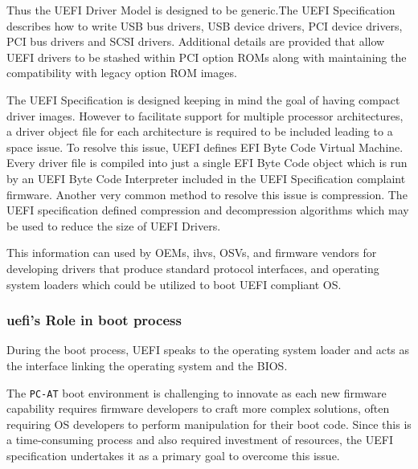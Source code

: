 Thus the UEFI Driver Model is designed to be generic.The UEFI Specification describes how to write USB bus drivers, USB device drivers, PCI device drivers, PCI bus drivers and SCSI drivers.
Additional details are provided that allow UEFI drivers to be stashed within PCI option ROMs along with maintaining the compatibility with legacy option ROM images.

The UEFI Specification is designed keeping in mind the goal of having compact driver images. However to facilitate support for multiple processor architectures, a driver object file for each architecture is required to be included leading to a space issue. To resolve this issue, UEFI defines EFI Byte Code Virtual Machine. Every driver file is compiled into just a single EFI Byte Code object which is run by an UEFI Byte Code Interpreter included in the UEFI Specification complaint firmware. Another very common method to resolve this issue is compression. The UEFI specification defined compression and decompression algorithms which may be used to reduce the size of UEFI Drivers.

This information can used by OEMs, \gls{ihv}s, OSVs, and firmware vendors for developing drivers that produce standard protocol interfaces, and operating system loaders which could be utilized to boot UEFI compliant OS.

\subsubsection{\gls{uefi}'s Role in boot process}

During the boot process, UEFI speaks to the operating system loader and acts as the interface linking the operating system and the BIOS.

The \verb|PC-AT| boot environment is challenging to innovate as each new firmware capability requires firmware developers to craft more complex solutions, often requiring OS developers to perform manipulation for their boot code. Since this is a time-consuming process and also required investment of resources, the UEFI specification undertakes it as a primary goal to overcome this issue.





